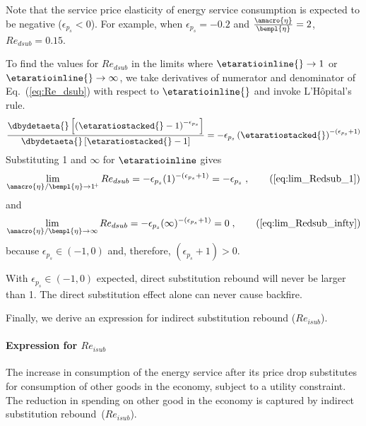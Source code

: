 Note that the service price elasticity of energy service consumption is
expected to be negative ($\epsilon_{p_s} < 0$).
For example, when $\epsilon_{p_s} = -0.2$ and $\frac{\amacro{\eta}}{\bempl{\eta}} = 2$,
$Re_{dsub} = 0.15$.

To find the values for $Re_{dsub}$ in the limits where $\etaratioinline{} \to 1$ or 
$\etaratioinline{} \to \infty$, we take derivatives of numerator and denominator
of Eq.~(\ref{eq:Re_dsub}) with respect to $\etaratioinline{}$ and invoke L'H\^{o}pital's rule.
%
\begin{equation}
  \frac{\dbydetaeta{}\left[ \left( \etaratiostacked{} - 1 \right)^{-\epsilon_{p_s}}  \right]}
           {\dbydetaeta{}\left[ \etaratiostacked{} - 1\right]}
    = -\epsilon_{p_s} \left( \etaratiostacked{} \right)^{-(\epsilon_{p_s} + 1)}
\end{equation}
%
Substituting 1 and $\infty$ for $\etaratioinline$ gives
\begin{equation}
  \lim_{\amacro{\eta}/\bempl{\eta} \to 1^{\!+}} Re_{dsub} 
    = -\epsilon_{p_s} ( 1 )^{-(\epsilon_{p_s} + 1)}
    = -\epsilon_{p_s} \; ,                               \tag{\ref{eq:lim_Redsub_1}}
\end{equation}
%
and
%
\begin{equation}
  \lim_{\amacro{\eta}/\bempl{\eta} \to \infty} Re_{dsub} 
    = -\epsilon_{p_s} ( \infty )^{-(\epsilon_{p_s} + 1)}
    = 0 \; ,                                              \tag{\ref{eq:lim_Redsub_infty}}
\end{equation}
%
because $\epsilon_{p_s} \in (-1, 0)$ and, therefore, $(\epsilon_{p_s} + 1) > 0$.

With $\epsilon_{p_s} \in (-1, 0)$ expected,
direct substitution rebound will never be larger than 1.
The direct substitution effect alone
can never cause backfire. 

Finally, we derive an expression for indirect substitution rebound ($Re_{isub}$).


\paragraph{Expression for $Re_{isub}$}
\label{sec:Re_isub}

The increase in consumption of the energy service after its price drop
substitutes for consumption of other goods in the economy,
subject to a utility constraint.
The reduction in spending on other good in the economy
is captured by indirect substitution rebound~($Re_{isub}$).

